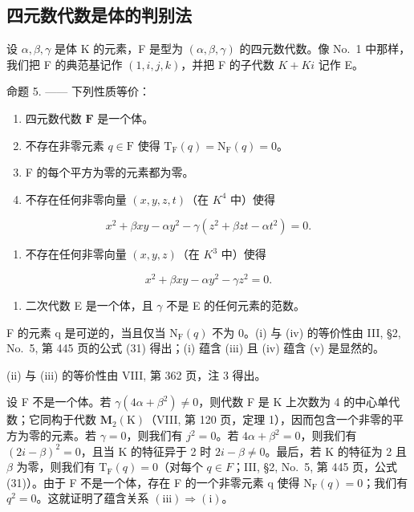 \subsection{四元数代数是体的判别法}

设 \(\alpha,\beta,\gamma\) 是体 K 的元素，F 是型为 \((\alpha,\beta,\gamma)\) 的四元数代数。像 No.~1 中那样，我们把 F 的典范基记作 \((1,i,j,k)\)，并把 F 的子代数 \(K+Ki\) 记作 E。

命题 5. —— 下列性质等价：

\begin{enumerate}
\def\labelenumi{(\roman{enumi})}
\item
  四元数代数 \(\mathbf{F}\) 是一个体。
\item
  不存在非零元素 \(q \in \mathrm{F}\) 使得 \(\mathrm{T}_{\mathrm{F}}(q) = \mathrm{N}_{\mathrm{F}}(q) = 0\)。
\item
  F 的每个平方为零的元素都为零。
\item
  不存在任何非零向量 \((x,y,z,t)\)（在 \(K^{4}\) 中）使得
\end{enumerate}

\[
x ^ {2} + \beta x y - \alpha y ^ {2} - \gamma (z ^ {2} + \beta z t - \alpha t ^ {2}) = 0.
\]

\begin{enumerate}
\def\labelenumi{(\alph{enumi})}
\setcounter{enumi}{21}
\tightlist
\item
  不存在任何非零向量 \((x,y,z)\)（在 \(K^{3}\) 中）使得
\end{enumerate}

\[
x ^ {2} + \beta x y - \alpha y ^ {2} - \gamma z ^ {2} = 0.
\]

\begin{enumerate}
\def\labelenumi{(\roman{enumi})}
\setcounter{enumi}{5}
\tightlist
\item
  二次代数 E 是一个体，且 \(\gamma\) 不是 E 的任何元素的范数。
\end{enumerate}

F 的元素 q 是可逆的，当且仅当 \(\mathrm{N}_{\mathrm{F}}(q)\) 不为 0。(i) 与 (iv) 的等价性由 III, §2, No.~5, 第 445 页的公式 (31) 得出；(i) 蕴含 (iii) 且 (iv) 蕴含 (v) 是显然的。

(ii) 与 (iii) 的等价性由 VIII, 第 362 页，注 3 得出。

设 F 不是一个体。若 \(\gamma(4\alpha+\beta^{2})\neq0\)，则代数 F 是 K 上次数为 4 的中心单代数；它同构于代数 \(\mathbf{M}_{2}(\mathrm{K})\)（VIII, 第 120 页，定理 1），因而包含一个非零的平方为零的元素。若 \(\gamma=0\)，则我们有 \(j^{2}=0\)。若 \(4\alpha+\beta^{2}=0\)，则我们有 \((2i-\beta)^{2}=0\)，且当 K 的特征异于 2 时 \(2i-\beta\neq0\)。最后，若 K 的特征为 2 且 \(\beta\) 为零，则我们有 \(\mathrm{T}_{\mathrm{F}}(q)=0\)（对每个 \(q\in F\)；III, §2, No.~5, 第 445 页，公式 (31)）。由于 F 不是一个体，存在 F 的一个非零元素 q 使得 \(\mathrm{N}_{\mathrm{F}}(q)=0\)；我们有 \(q^{2}=0\)。这就证明了蕴含关系 \((\mathrm{iii})\Rightarrow(\mathrm{i})\)。

